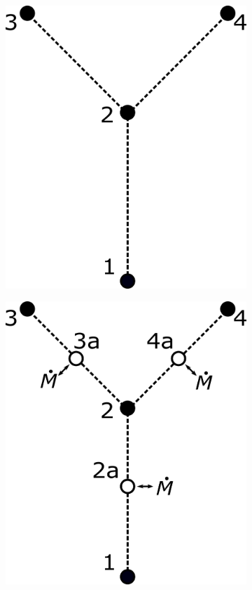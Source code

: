 \documentclass[11pt,english,a4paper,twoside,openright]{report}
\begin{document}
{{{{{{{{\begin{figure}[h]
	\centering
	\begin{subfigure}[b]{0.35\textwidth}
		\centering
		\includegraphics{VesselPoints2}
	\end{subfigure}
	\begin{subfigure}[b]{0.35\textwidth}
		\centering
		\includegraphics{VesselPoints}

\end{subfigure}
\end{figure}}}}}}}}}
\end{document}
